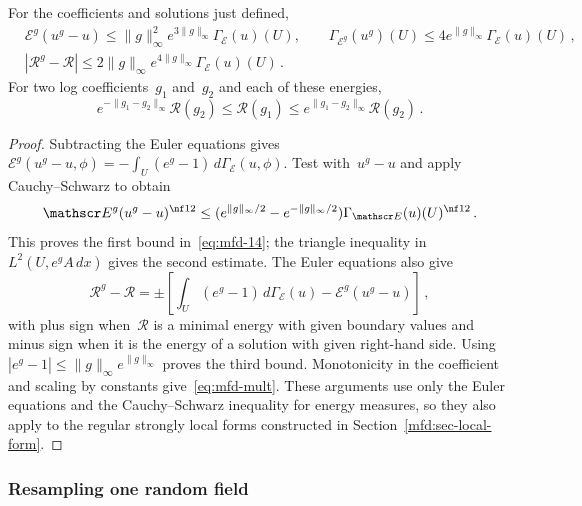 \documentclass[11pt]{amsart}
\begin{document}
\begin{lemma}
\label{mfd:cor-14}
For the coefficients and solutions just defined,
\begin{equation}
	\begin{aligned}
		&\mathscr E^g(u^g-u)\leq\|g\|_\infty^2e^{3\|g\|_\infty}\Gamma_{\mathscr E}(u)(U),\qquad
		\Gamma_{\mathscr E^g}(u^g)(U)\leq4e^{\|g\|_\infty}\Gamma_{\mathscr E}(u)(U)\,,\\
		&|\mathcal R^g-\mathcal R|\leq2\|g\|_\infty e^{4\|g\|_\infty}\Gamma_{\mathscr E}(u)(U)\,.
	\end{aligned}
	\label{eq:mfd-14}
\end{equation}
For two log coefficients~$g_1$ and~$g_2$ and each of these energies,
\begin{equation}
	e^{-\|g_1-g_2\|_\infty}\mathcal R(g_2)\leq\mathcal R(g_1)
	\leq e^{\|g_1-g_2\|_\infty}\mathcal R(g_2)\,.
	\label{eq:mfd-mult}
\end{equation}
\end{lemma}
\begin{proof}
Subtracting the Euler equations gives~$\mathscr E^g(u^g-u,\phi)=-\int_U(e^g-1)\,d\Gamma_{\mathscr E}(u,\phi)$. Test with~$u^g-u$ and apply Cauchy--Schwarz to obtain
\begin{equation}
	\mathscr E^g(u^g-u)^{\nf12}\leq
	(e^{\|g\|_\infty/2}-e^{-\|g\|_\infty/2})\Gamma_{\mathscr E}(u)(U)^{\nf12}\,.
	\label{eq:mfd-perturbation-sharp}
\end{equation}
This proves the first bound in~\eqref{eq:mfd-14}; the triangle inequality in~$L^2(U,e^gA\,dx)$ gives the second estimate. The Euler equations also give
\begin{equation*}
	\mathcal R^g-\mathcal R
	=\pm\left[\int_U(e^g-1)\,d\Gamma_{\mathscr E}(u)-\mathscr E^g(u^g-u)\right]\,,
\end{equation*}
with plus sign when~$\mathcal R$ is a minimal energy with given boundary values and minus sign when it is the energy of a solution with given right-hand side. Using~$|e^g-1|\leq\|g\|_\infty e^{\|g\|_\infty}$ proves the third bound. Monotonicity in the coefficient and scaling by constants give~\eqref{eq:mfd-mult}. These arguments use only the Euler equations and the Cauchy--Schwarz inequality for energy measures, so they also apply to the regular strongly local forms constructed in Section~\ref{mfd:sec-local-form}.
\end{proof}

\subsubsection{Resampling one random field}
\end{document}
